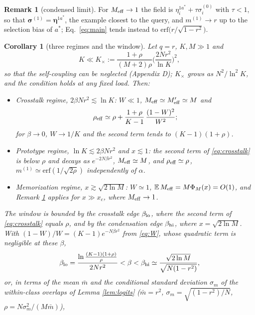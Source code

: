 \documentclass{SciPost}
\theoremstyle{plain}
\newtheorem{corollary}{Corollary}
\theoremstyle{definition}
\newtheorem{remark}{Remark}
\newcommand{\s}{\bm{\sigma}}
\newcommand{\e}{\bm{\eta}}
\newcommand{\E}{\mathbb{E}}
\newcommand{\Meff}{M_{\rm eff}}
\newcommand{\erf}{\mathrm{erf}}
\begin{document}
\begin{remark}[condensed limit]\label{rem:cond}
For $\Meff\to1$ the field is $\eta^{1a^*}_i+\tau\sigma^{(0)}_i$ with $\tau<1$, so that $\s^{(1)}=\e^{1a^*}$, the example closest to the query, and $m^{(1)}\to r$ up to the selection bias of $a^*$; Eq.\ \eqref{eq:main} tends instead to $\erf\big(r/\sqrt{1-r^2}\big)$.
\end{remark}

\begin{corollary}[three regimes and the window]\label{cor:regimes}
Let $q=r$, $K,M\gg1$ and
\begin{equation*}
K\ll K_\times:=\frac{1+\rho}{(M+2)\rho}\Big(\frac{2Nr^2}{\ln K}\Big)^2,
\end{equation*}
so that the self-coupling can be neglected (Appendix D); $K_\times$ grows as $N^2/\ln^2K$, and the condition holds at any fixed load. Then:
\begin{itemize}\setlength\itemsep{1pt}
\item[(i)] \emph{Crosstalk regime}, $2\beta Nr^2\lesssim\ln K$: $W\ll1$, $\Meff\simeq\Meff'\simeq M$ and
\begin{equation}
\rho_{\rm eff}\simeq\rho+\frac{1+\rho}{K-1}\,\frac{(1-W)^2}{W^2};
\label{eq:crosstalk}
\end{equation}
for $\beta\to0$, $W\to1/K$ and the second term tends to $(K-1)(1+\rho)$.
\item[(ii)] \emph{Prototype regime}, $\ln K\lesssim2\beta Nr^2$ and $x\lesssim1$: the second term of \eqref{eq:crosstalk} is below $\rho$ and decays as $e^{-2N\beta r^2}$, $\Meff\simeq M$, and $\rho_{\rm eff}\simeq\rho$, $m^{(1)}\simeq\erf(1/\sqrt{2\rho})$ independently of $\alpha$.
\item[(iii)] \emph{Memorization regime}, $x\gtrsim\sqrt{2\ln M}$: $W\simeq1$, $\E\,\Meff=M\Phi_M(x)=O(1)$, and Remark \ref{rem:cond} applies for $x\gg x_c$, where $\Meff\to1$.
\end{itemize}
The window is bounded by the \emph{crosstalk edge} $\beta_{\rm lo}$, where the second term of \eqref{eq:crosstalk} equals $\rho$, and by the \emph{condensation edge} $\beta_{\rm hi}$, where $x=\sqrt{2\ln M}$. With $(1-W)/W=(K-1)e^{-N\beta r^2}$ from \eqref{eq:W}, whose quadratic term is negligible at these $\beta$,
\begin{equation}
\beta_{\rm lo}=\frac{\ln\frac{(K-1)(1+\rho)}{\rho}}{2Nr^2}<\beta<\beta_{\rm hi}\simeq\frac{\sqrt{2\ln M}}{\sqrt{N(1-r^2)}},
\label{eq:window}
\end{equation}
or, in terms of the mean $\bar m$ and the conditional standard deviation $\sigma_m$ of the within-class overlaps of Lemma \ref{lem:logits} ($\bar m=r^2$, $\sigma_m=\sqrt{(1-r^2)/N}$, $\rho=N\sigma_m^2/(M\bar m)$),

\end{corollary}
\end{document}
